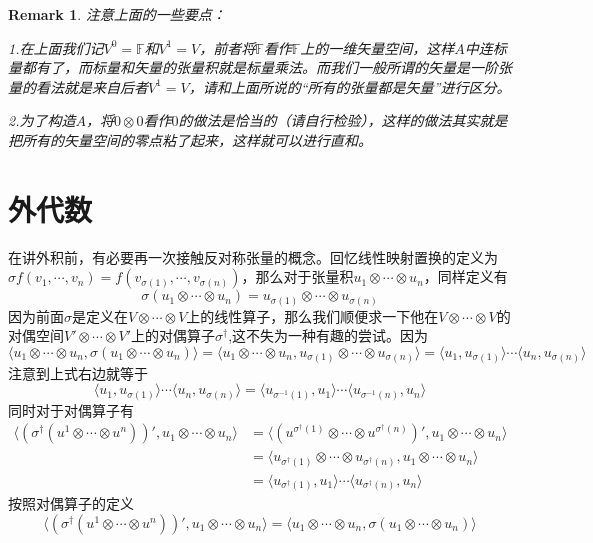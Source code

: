 \documentclass[11pt,a4paper,openany]{book}%
\theoremstyle{plain}%
\newtheorem*{rem}{Remark}%
\begin{document}
\begin{rem}
注意上面的一些要点：

1.在上面我们记$V^0=\mathbb{F}$和$V^1=V$，前者将$\mathbb{F}$看作$\mathbb{F}$上的一维矢量空间，这样$A$中连标量都有了，而标量和矢量的张量积就是标量乘法。而我们一般所谓的矢量是一阶张量的看法就是来自后者$V^1=V$，请和上面所说的“所有的张量都是矢量”进行区分。

2.为了构造$A$，将$0 \otimes 0$看作$0$的做法是恰当的（请自行检验），这样的做法其实就是把所有的矢量空间的零点粘了起来，这样就可以进行直和。
\end{rem}
\section{外代数}
在讲外积前，有必要再一次接触反对称张量的概念。回忆线性映射置换的定义为$\sigma f(v_1,\cdots,v_n)=f(v_{\sigma(1)},\cdots,v_{\sigma(n)})$，那么对于张量积$u_1\otimes \cdots \otimes u_n$，同样定义有
\[
\sigma(u_1\otimes \cdots \otimes u_n)=u_{\sigma(1)}\otimes \cdots \otimes u_{\sigma(n)}
\]
因为前面$\sigma$是定义在$V\otimes \cdots \otimes V$上的线性算子，那么我们顺便求一下他在$V\otimes \cdots \otimes V$的对偶空间$V'\otimes \cdots \otimes V'$上的对偶算子$\sigma^\dag$,这不失为一种有趣的尝试。因为
\[
\langle u_1\otimes \cdots \otimes u_n,\sigma(u_1\otimes \cdots \otimes u_n)\rangle=\langle u_1\otimes \cdots \otimes u_n,u_{\sigma(1)}\otimes \cdots \otimes u_{\sigma(n)}\rangle=\langle u_1,u_{\sigma(1)} \rangle \cdots \langle u_n,u_{\sigma(n)} \rangle
\]
注意到上式右边就等于
\[
\langle u_1,u_{\sigma(1)} \rangle \cdots \langle u_n,u_{\sigma(n)} \rangle=\langle u_{\sigma^{-1}(1)},u_{1} \rangle \cdots \langle u_{\sigma^{-1}(n)},u_{n} \rangle
\]
同时对于对偶算子有
\begin{equation*}
\begin{split}
\langle(\sigma^\dag(u^1\otimes \cdots \otimes u^n))',u_1\otimes \cdots \otimes u_n\rangle &=\langle(u^{\sigma^\dag(1)}\otimes \cdots \otimes u^{\sigma^\dag(n)})',u_1\otimes \cdots \otimes u_n\rangle \\
&=\langle u_{\sigma^\dag(1)}\otimes \cdots \otimes u_{\sigma^\dag(n)},u_1\otimes \cdots \otimes u_n\rangle\\
&=\langle u_{\sigma^{\dag}(1)},u_{1} \rangle \cdots \langle u_{\sigma^{\dag}(n)},u_{n} \rangle
\end{split}
\end{equation*}
按照对偶算子的定义
\[
\langle(\sigma^\dag(u^1\otimes \cdots \otimes u^n))',u_1\otimes \cdots \otimes u_n\rangle =\langle u_1\otimes \cdots \otimes u_n,\sigma(u_1\otimes \cdots \otimes u_n)\rangle
\]
\end{document}
